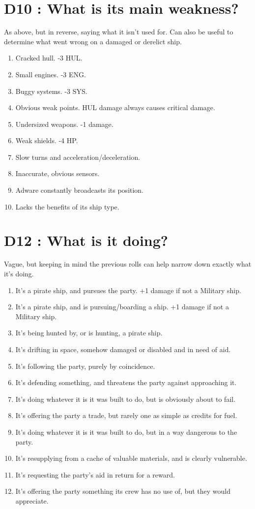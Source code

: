 \documentclass{article}
\begin{document}
\section*{D10 : What is its main weakness?}
As above, but in reverse, saying what it isn't used for. Can also be useful to determine what went wrong on a damaged or derelict ship.
\begin{enumerate}
	\item Cracked hull. -3 HUL.
	\item Small engines. -3 ENG.
	\item Buggy systems. -3 SYS.
	\item Obvious weak points. HUL damage always causes critical damage.
	\item Undersized weapons. -1 damage.
	\item Weak shields. -4 HP.
	\item Slow turns and acceleration/deceleration.
	\item Inaccurate, obvious sensors.
	\item Adware constantly broadcasts its position.
	\item Lacks the benefits of its ship type.
\end{enumerate}

\section*{D12 : What is it doing?}
Vague, but keeping in mind the previous rolls can help narrow down exactly what it's doing.
\begin{enumerate}
	\item It's a pirate ship, and pursues the party. +1 damage if not a Military ship.
	\item It's a pirate ship, and is pursuing/boarding a ship. +1 damage if not a Military ship.
	\item It's being hunted by, or is hunting, a pirate ship.
	\item It's drifting in space, somehow damaged or disabled and in need of aid.
	\item It's following the party, purely by coincidence.
	\item It's defending something, and threatens the party against approaching it.
	\item It's doing whatever it is it was built to do, but is obviously about to fail.
	\item It's offering the party a trade, but rarely one as simple as credits for fuel.
	\item It's doing whatever it is it was built to do, but in a way dangerous to the party.
	\item It's resupplying from a cache of valuable materials, and is clearly vulnerable.
	\item It's requesting the party's aid in return for a reward.
	\item It's offering the party something its crew has no use of, but they would appreciate.
\end{enumerate}
\end{document}
